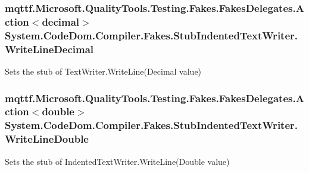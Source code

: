 \hypertarget{class_system_1_1_code_dom_1_1_compiler_1_1_fakes_1_1_stub_indented_text_writer_a139f6d338011e291abce022932196d7f}{
\subsubsection[{Write\-Line\-Decimal}]{\setlength{\rightskip}{0pt plus 5cm}mqttf.\-Microsoft.\-Quality\-Tools.\-Testing.\-Fakes.\-Fakes\-Delegates.\-Action$<$decimal$>$ System.\-Code\-Dom.\-Compiler.\-Fakes.\-Stub\-Indented\-Text\-Writer.\-Write\-Line\-Decimal}}\label{class_system_1_1_code_dom_1_1_compiler_1_1_fakes_1_1_stub_indented_text_writer_a139f6d338011e291abce022932196d7f}


Sets the stub of Text\-Writer.\-Write\-Line(\-Decimal value)

\hypertarget{class_system_1_1_code_dom_1_1_compiler_1_1_fakes_1_1_stub_indented_text_writer_aa0f42fd4fe39c21689ee0cbb76351f03}{
\subsubsection[{Write\-Line\-Double}]{\setlength{\rightskip}{0pt plus 5cm}mqttf.\-Microsoft.\-Quality\-Tools.\-Testing.\-Fakes.\-Fakes\-Delegates.\-Action$<$double$>$ System.\-Code\-Dom.\-Compiler.\-Fakes.\-Stub\-Indented\-Text\-Writer.\-Write\-Line\-Double}}\label{class_system_1_1_code_dom_1_1_compiler_1_1_fakes_1_1_stub_indented_text_writer_aa0f42fd4fe39c21689ee0cbb76351f03}


Sets the stub of Indented\-Text\-Writer.\-Write\-Line(\-Double value)


